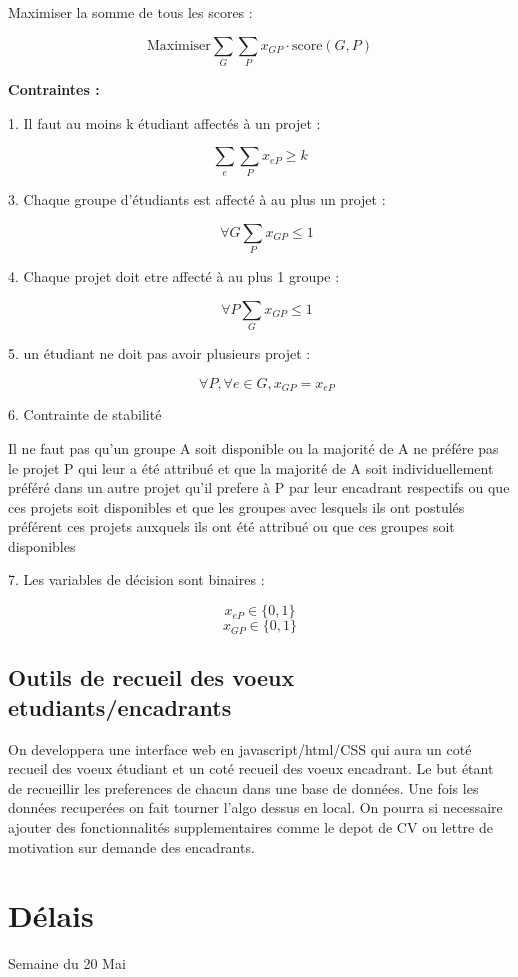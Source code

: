\documentclass{article}
\begin{document}
Maximiser la somme de tous les scores :

\[ \text{Maximiser} \sum_{G} \sum_{P} x_{GP} \cdot \text{score}(G, P) \]

\textbf{Contraintes :}

1. Il faut au moins k étudiant affectés à un projet : 

\[ \sum_{e} \sum_{P} x_{eP} \geq k \]

3. Chaque groupe d'étudiants est affecté à au plus un projet :

\[ \quad \forall G \sum_{P} x_{GP} \leq 1 \]

4. Chaque projet doit etre affecté à au plus 1 groupe : 

\[\quad \forall P \sum_{G} x_{GP} \leq 1 \]

5. un étudiant ne doit pas avoir plusieurs projet : 

\[\quad \forall P, \forall e \in G, x_{GP} = x_{eP} \]

6. Contrainte de stabilité 

\vspace{1em}

Il ne faut pas qu'un groupe A soit disponible ou la majorité de A ne préfére pas le projet P qui leur 
a été attribué et que la majorité de A soit individuellement préféré dans un autre projet qu'il 
prefere à P par leur encadrant respectifs ou que ces projets soit disponibles et que les groupes avec 
lesquels ils ont postulés préférent ces projets auxquels ils ont été attribué ou que ces groupes soit 
disponibles

\vspace{1em}

7. Les variables de décision sont binaires :

\[ x_{eP} \in \{0, 1\} \]
\[ x_{GP} \in \{0, 1\} \]

\subsection{Outils de recueil des voeux etudiants/encadrants}

On developpera une interface web en javascript/html/CSS qui aura un coté recueil des voeux étudiant et un coté recueil des voeux encadrant.
Le but étant de recueillir les preferences de chacun dans une base de données. Une fois les données recuperées on fait tourner l'algo dessus en local.
On pourra si necessaire ajouter des fonctionnalités supplementaires comme le depot de CV ou lettre de motivation sur demande des encadrants.


\section{Délais}

Semaine du 20 Mai
\end{document}
